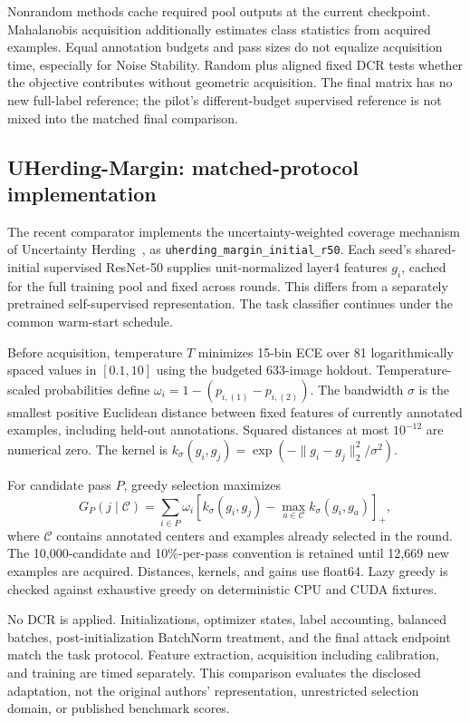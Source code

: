 \documentclass[a4paper,fleqn]{cas-dc}
\begin{document}
Nonrandom methods cache required pool outputs at the current
checkpoint. Mahalanobis acquisition additionally estimates class
statistics from acquired examples.
Equal annotation budgets and pass sizes do not equalize
acquisition time, especially for Noise Stability.
Random plus aligned fixed DCR tests whether the objective
contributes without geometric acquisition.
The final matrix has no new full-label reference; the pilot's
different-budget supervised reference is not mixed into the
matched final comparison.

\subsection{UHerding-Margin: matched-protocol implementation}
\label{sec:uherding_setup}

The recent comparator implements the uncertainty-weighted coverage
mechanism of Uncertainty Herding~\cite{bae2025uncertainty},
as \texttt{uherding\_margin\_initial\_r50}.
Each seed's shared-initial supervised ResNet-50 supplies
unit-normalized layer4 features $g_i$, cached for the full
training pool and fixed across rounds.
This differs from a separately pretrained self-supervised
representation. The task classifier continues under the
common warm-start schedule.

Before acquisition, temperature $T$ minimizes 15-bin ECE over
81 logarithmically spaced values in $[0.1,10]$ using the
budgeted 633-image holdout.
Temperature-scaled probabilities define
$\omega_i=1-(p_{i,(1)}-p_{i,(2)})$.
The bandwidth $\sigma$ is the smallest positive Euclidean
distance between fixed features of currently annotated examples,
including held-out annotations. Squared distances at most
$10^{-12}$ are numerical zero.
The kernel is
$k_\sigma(g_i,g_j)=\exp(-\|g_i-g_j\|_2^2/\sigma^2)$.

For candidate pass $P$, greedy selection maximizes
\begin{equation}
 G_P(j\mid\mathcal C)=
 \sum_{i\in P}\omega_i
 \left[
 k_\sigma(g_i,g_j)-
 \max_{a\in\mathcal C}k_\sigma(g_i,g_a)
 \right]_+,
 \label{eq:uherding_gain}
\end{equation}
where $\mathcal C$ contains annotated centers and examples
already selected in the round.
The 10,000-candidate and 10\%-per-pass convention is retained
until 12,669 new examples are acquired.
Distances, kernels, and gains use float64.
Lazy greedy is checked against exhaustive greedy on
deterministic CPU and CUDA fixtures.

No DCR is applied. Initializations, optimizer states, label
accounting, balanced batches, post-initialization BatchNorm
treatment, and the final attack endpoint match the task protocol.
Feature extraction, acquisition including calibration, and
training are timed separately.
This comparison evaluates the disclosed adaptation, not the
original authors' representation, unrestricted selection domain,
or published benchmark scores.
\end{document}
